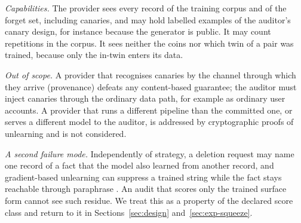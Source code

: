 \emph{Capabilities.} The provider sees every record of the training corpus and of the forget
set, including canaries, and may hold labelled examples of the auditor's canary design, for
instance because the generator is public. It may count repetitions in the corpus. It sees
neither the coins nor which twin of a pair was trained, because only the in-twin enters
its data.

\emph{Out of scope.} A provider that recognises canaries by the channel through which they
arrive (provenance) defeats any content-based guarantee; the auditor must inject canaries
through the ordinary data path, for example as ordinary user accounts. A provider that runs
a different pipeline than the committed one, or serves a different model to the auditor,
is addressed by cryptographic proofs of unlearning \citep{eisenhofer2025verifiable} and is
not considered.

\emph{A second failure mode.} Independently of strategy, a deletion request may name one
record of a fact that the model also learned from another record, and gradient-based
unlearning can suppress a trained string while the fact stays reachable through paraphrase
\citep{li2026beliefs}. An audit that scores only the trained surface form cannot see such
residue. We treat this as a property of the declared score class and return to it in
Sections~\ref{sec:design} and~\ref{sec:exp-squeeze}.

